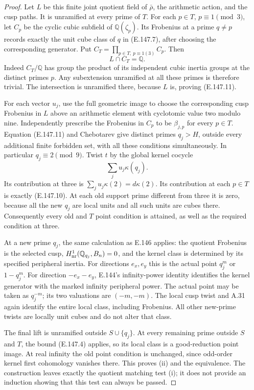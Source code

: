 \begin{proof}
Let \(L\) be this finite joint quotient
field of \(\bar\rho\), the arithmetic
action, and the cusp paths.
It is unramified at every prime of \(T\).
For each \(p\in T\), \(p\equiv1\pmod3\),
let \(C_p\) be the cyclic cubic subfield
of \(\mathbb Q(\zeta_p)\).
Its Frobenius at a prime \(q\ne p\)
records exactly the unit cube class
of \(q\) in (E.147.7), after choosing
the corresponding generator.
Put \(C_T=\prod_{p\in T,\ p\equiv1(3)}C_p\).
Then
\[
                          L\cap C_T=\mathbb Q .
 \tag{E.147.11}
\]
Indeed \(C_T/\mathbb Q\) has group the
product of its independent cubic inertia
groups at the distinct primes \(p\).
Any subextension unramified at all these
primes is therefore trivial.
The intersection is unramified there,
because \(L\) is, proving (E.147.11).

For each vector \(u_j\), use the full
geometric image to choose the
corresponding cusp Frobenius in \(L\)
above an arithmetic element with
cyclotomic value two modulo nine.
Independently prescribe the Frobenius
in \(C_p\) to be \(\beta_{j,p}\) for
every \(p\in T\).
Equation (E.147.11) and Chebotarev give
distinct primes \(q_j>H\), outside every
additional finite forbidden set, with
all these conditions simultaneously.
In particular \(q_j\equiv2\pmod9\).
Twist \(t\) by the global kernel cocycle
\[
                         \sum_j u_j\kappa(q_j).
 \tag{E.147.12}
\]
Its contribution at three is
\(\sum_j u_j\kappa(2)=d\kappa(2)\).
Its contribution at each \(p\in T\)
is exactly (E.147.10).
At each old support prime different
from three it is zero, because all
the new \(q_j\) are local units and
all such units are cubes there.
Consequently every old and \(T\)
point condition is attained, as well
as the required condition at three.

At a new prime \(q_j\), the same
calculation as E.146 applies:
the quotient Frobenius is the selected
cusp, \(H^1_{\rm nr}(\mathbb Q_{q_j},B_n)=0\),
and the kernel class is determined by
its specified peripheral inertia.
For directions \(e_x,e_y\) this is the
actual point \(q_j^m\) or \(1-q_j^m\).
For direction \(-e_x-e_y\), E.144's
infinity-power identity identifies
the kernel generator with the marked
infinity peripheral power.
The actual point may be taken as
\(q_j^{-m}\); its two valuations are
\((-m,-m)\).
The local cusp twist and A.31 again
identify the entire local class,
including Frobenius.
All other new-prime twists are locally
unit cubes and do not alter that class.

The final lift is unramified outside
\(S\cup\{q_j\}\).
At every remaining prime outside \(S\)
and \(T\), the bound (E.147.4) applies,
so its local class is a good-reduction
point image. At real infinity the
old point condition is unchanged,
since odd-order kernel first cohomology
vanishes there.
This proves (ii) and the equivalence.
The construction leaves exactly the
quotient matching test (i); it does not
provide an induction showing that this
test can always be passed.
\end{proof}
